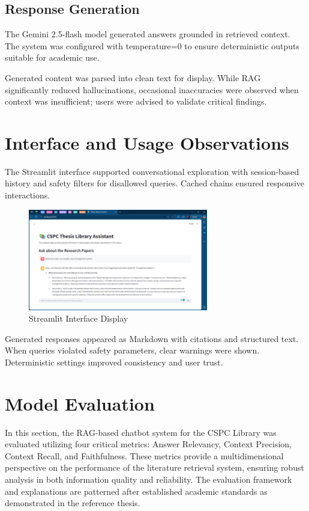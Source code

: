 \begin{refsection}
\subsection{Response Generation}

The Gemini 2.5-flash model generated answers grounded in retrieved context. The system was configured with temperature=0 to ensure deterministic outputs suitable for academic use.


Generated content was parsed into clean text for display. While RAG significantly reduced hallucinations, occasional inaccuracies were observed when context was insufficient; users were advised to validate critical findings.

\section{Interface and Usage Observations}

The Streamlit interface supported conversational exploration with session-based history and safety filters for disallowed queries. Cached chains ensured responsive interactions.

\begin{figure}[h]
    \centering
    \includegraphics[width=0.7\textwidth]{figures/streamlit.png}
    \caption{Streamlit Interface Display}
\end{figure}

Generated responses appeared as Markdown with citations and structured text. When queries violated safety parameters, clear warnings were shown. Deterministic settings improved consistency and user trust.

\section{Model Evaluation}
In this section, the RAG-based chatbot system for the CSPC Library was evaluated utilizing four critical metrics: Answer Relevancy, Context Precision, Context Recall, and Faithfulness. These metrics provide a multidimensional perspective on the performance of the literature retrieval system, ensuring robust analysis in both information quality and reliability. The evaluation framework and explanations are patterned after established academic standards as demonstrated in the reference thesis.


\end{refsection}
